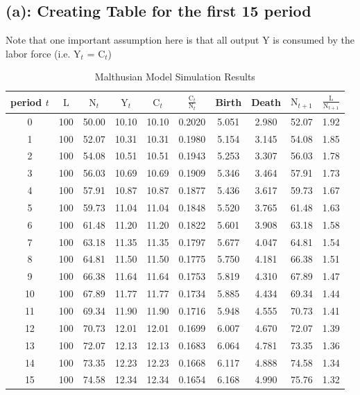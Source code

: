 \documentclass[12pt]{article}
\begin{document}
\subsection*{(a): Creating Table for the first 15 period}
Note that one important assumption here is that all output $\mathrm{Y}$ is consumed by the labor force (i.e. $\mathrm{Y}_t$ = $\mathrm{C}_t$)
\begin{table}[H]
\centering
\caption{Malthusian Model Simulation Results}
\begin{tabular}{c|ccccccccc}
\toprule
period $t$ & $\mathrm{L}$ & $\mathrm{N}_t$ & $\mathrm{Y}_t$ & $\mathrm{C}_t$ & $\frac{\mathrm{C}_t}{\mathrm{N}_t}$ & Birth & Death & $\mathrm{N}_{t+1}$ & $\frac{\mathrm{L}}{\mathrm{N}_{t+1}}$\\
\midrule
0  & 100 & 50.00 & 10.10 & 10.10 & 0.2020 & 5.051 & 2.980 & 52.07 & 1.92 \\
1  & 100 & 52.07 & 10.31 & 10.31 & 0.1980 & 5.154 & 3.145 & 54.08 & 1.85 \\
2  & 100 & 54.08 & 10.51 & 10.51 & 0.1943 & 5.253 & 3.307 & 56.03 & 1.78 \\
3  & 100 & 56.03 & 10.69 & 10.69 & 0.1909 & 5.346 & 3.464 & 57.91 & 1.73 \\
4  & 100 & 57.91 & 10.87 & 10.87 & 0.1877 & 5.436 & 3.617 & 59.73 & 1.67 \\
5  & 100 & 59.73 & 11.04 & 11.04 & 0.1848 & 5.520 & 3.765 & 61.48 & 1.63 \\
6  & 100 & 61.48 & 11.20 & 11.20 & 0.1822 & 5.601 & 3.908 & 63.18 & 1.58 \\
7  & 100 & 63.18 & 11.35 & 11.35 & 0.1797 & 5.677 & 4.047 & 64.81 & 1.54 \\
8  & 100 & 64.81 & 11.50 & 11.50 & 0.1775 & 5.750 & 4.181 & 66.38 & 1.51 \\
9  & 100 & 66.38 & 11.64 & 11.64 & 0.1753 & 5.819 & 4.310 & 67.89 & 1.47 \\
10 & 100 & 67.89 & 11.77 & 11.77 & 0.1734 & 5.885 & 4.434 & 69.34 & 1.44 \\
11 & 100 & 69.34 & 11.90 & 11.90 & 0.1716 & 5.948 & 4.555 & 70.73 & 1.41 \\
12 & 100 & 70.73 & 12.01 & 12.01 & 0.1699 & 6.007 & 4.670 & 72.07 & 1.39 \\
13 & 100 & 72.07 & 12.13 & 12.13 & 0.1683 & 6.064 & 4.781 & 73.35 & 1.36 \\
14 & 100 & 73.35 & 12.23 & 12.23 & 0.1668 & 6.117 & 4.888 & 74.58 & 1.34 \\
15 & 100 & 74.58 & 12.34 & 12.34 & 0.1654 & 6.168 & 4.990 & 75.76 & 1.32 \\
\bottomrule
\end{tabular}
\end{table}
\end{document}
